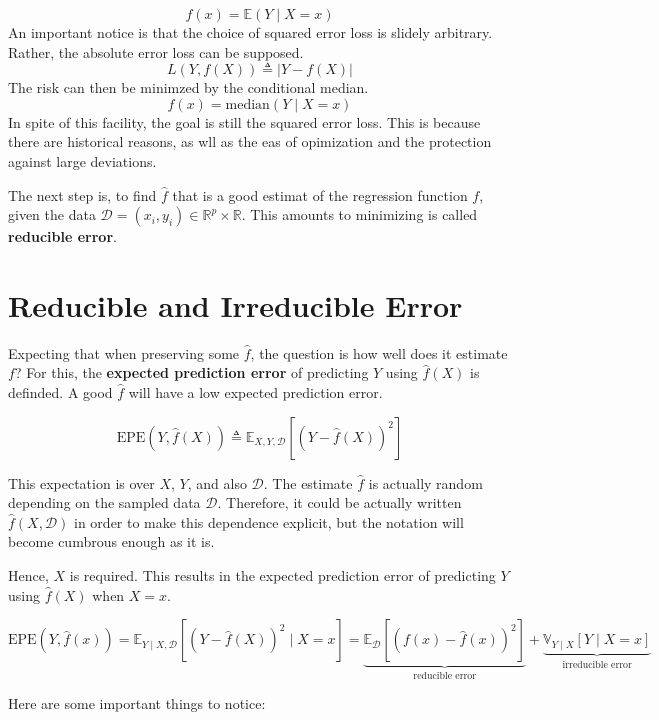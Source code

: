 \documentclass[]{report}
\begin{document}
\[
f(x) = \mathbb{E}(Y \mid X = x)
\] An important notice is that the choice of squared error loss is
slidely arbitrary. Rather, the absolute error loss can be supposed. \[
L(Y, f(X)) \triangleq | Y - f(X) | 
\] The risk can then be minimzed by the conditional median. \[
f(x) = \text{median}(Y \mid X = x)
\] In spite of this facility, the goal is still the squared error loss.
This is because there are historical reasons, as wll as the eas of
opimization and the protection against large deviations.

The next step is, to find \(\hat{f}\) that is a good estimat of the
regression function \(f\), given the data
\(\mathcal{D} = (x_i, y_i) \in \mathbb{R}^p \times \mathbb{R}\). This
amounts to minimizing is called \textbf{reducible error}.

\section{Reducible and Irreducible
Error}\label{reducible-and-irreducible-error}

Expecting that when preserving some \(\hat{f}\), the question is how
well does it estimate \(f\)? For this, the \textbf{expected prediction
error} of predicting \(Y\) using \(\hat{f}(X)\) is definded. A good
\(\hat{f}\) will have a low expected prediction error.

\[
\text{EPE}\left(Y, \hat{f}(X)\right) \triangleq \mathbb{E}_{X, Y, \mathcal{D}} \left[  \left( Y - \hat{f}(X) \right)^2 \right]
\]

This expectation is over \(X\), \(Y\), and also \(\mathcal{D}\). The
estimate \(\hat{f}\) is actually random depending on the sampled data
\(\mathcal{D}\). Therefore, it could be actually written
\(\hat{f}(X, \mathcal{D})\) in order to make this dependence explicit,
but the notation will become cumbrous enough as it is.

Hence, \(X\) is required. This results in the expected prediction error
of predicting \(Y\) using \(\hat{f}(X)\) when \(X = x\).

\[
\text{EPE}\left(Y, \hat{f}(x)\right) = 
\mathbb{E}_{Y \mid X, \mathcal{D}} \left[  \left(Y - \hat{f}(X) \right)^2 \mid X = x \right] = 
\underbrace{\mathbb{E}_{\mathcal{D}} \left[  \left(f(x) - \hat{f}(x) \right)^2 \right]}_\textrm{reducible error} + 
\underbrace{\mathbb{V}_{Y \mid X} \left[ Y \mid X = x \right]}_\textrm{irreducible error}
\]

Here are some important things to notice:
\end{document}
